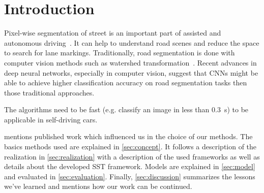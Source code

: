 
\section{Introduction}
\label{sec:introduction}
Pixel-wise segmentation of street is an important part of assisted and
autonomous driving~\cite{Tarel2009}. It can help to understand road scenes and
reduce the space to search for lane markings. Traditionally, road segmentation
is done with computer vision methods such as watershed
transformation~\cite{Beucher1990}. Recent advances in deep neural networks,
especially in computer vision, suggest that \glspl{CNN} might be able to
achieve higher classification accuracy on road segmentation tasks then those
traditional approaches.

The algorithms need to be fast (e.g. classify an image in less than
\SI{0.3}{\second}) to be applicable in self-driving cars.

 mentions published work which influenced us in the
choice of our methods. The basics methods used are explained in
\cref{sec:concept}. It follows a description of the realization in
\cref{sec:realization} with a description of the used frameworks as well as
details about the developed SST framework. Models are explained in
\cref{sec:model} and evaluated in \cref{sec:evaluation}. Finally,
\cref{sec:discussion} summarizes the lessons we've learned and mentions how
our work can be continued.